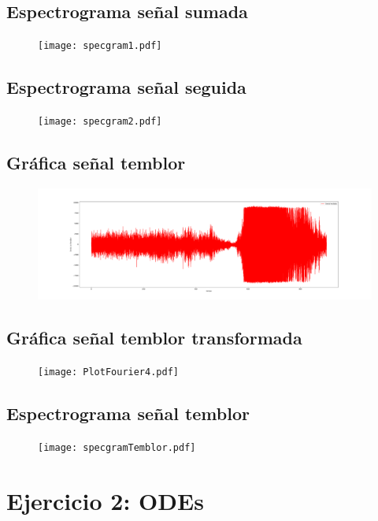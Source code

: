 \documentclass[11pt,letterpaper]{exam}
\begin{document}
\subsection{Espectrograma señal sumada}
\begin{figure}[H]
\centering
\texttt{[image: specgram1.pdf]}
\end{figure}

\subsection{Espectrograma señal seguida}
\begin{figure}[H]
\centering
\texttt{[image: specgram2.pdf]}
\end{figure}

\subsection{Gráfica señal temblor}
\begin{figure}[H]
\centering
\includegraphics[scale=0.25]{PlotFourier3.pdf}
\end{figure}

\subsection{Gráfica señal temblor transformada}
\begin{figure}[H]
\centering
\texttt{[image: PlotFourier4.pdf]}
\end{figure}

\subsection{Espectrograma señal temblor}
\begin{figure}[H]
\centering
\texttt{[image: specgramTemblor.pdf]}
\end{figure}

\section{Ejercicio 2: ODEs}
\end{document}
